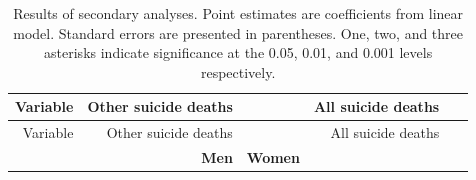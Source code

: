 \documentclass[]{article}
\begin{document}
\begin{longtable}[c]{@{}rrrrr@{}}
\caption{Results of secondary analyses. Point estimates are coefficients
from linear model. Standard errors are presented in parentheses. One,
two, and three asterisks indicate significance at the 0.05, 0.01, and
0.001 levels respectively.}\tabularnewline
\toprule
\begin{minipage}[b]{0.17\columnwidth}\raggedleft\strut
Variable
\strut\end{minipage} &
\begin{minipage}[b]{0.20\columnwidth}\raggedleft\strut
Other suicide deaths
\strut\end{minipage} &
\begin{minipage}[b]{0.16\columnwidth}\raggedleft\strut
~
\strut\end{minipage} &
\begin{minipage}[b]{0.18\columnwidth}\raggedleft\strut
All suicide deaths
\strut\end{minipage} &
\begin{minipage}[b]{0.15\columnwidth}\raggedleft\strut
~
\strut\end{minipage}\tabularnewline
\midrule
\endfirsthead
\toprule
\begin{minipage}[b]{0.17\columnwidth}\raggedleft\strut
Variable
\strut\end{minipage} &
\begin{minipage}[b]{0.20\columnwidth}\raggedleft\strut
Other suicide deaths
\strut\end{minipage} &
\begin{minipage}[b]{0.16\columnwidth}\raggedleft\strut
~
\strut\end{minipage} &
\begin{minipage}[b]{0.18\columnwidth}\raggedleft\strut
All suicide deaths
\strut\end{minipage} &
\begin{minipage}[b]{0.15\columnwidth}\raggedleft\strut
~
\strut\end{minipage}\tabularnewline
\midrule
\endhead
\begin{minipage}[t]{0.17\columnwidth}\raggedleft\strut
\strut\end{minipage} &
\begin{minipage}[t]{0.20\columnwidth}\raggedleft\strut
\textbf{Men}
\strut\end{minipage} &
\begin{minipage}[t]{0.16\columnwidth}\raggedleft\strut
\textbf{Women}
\strut\end{minipage} &

\end{longtable}
\end{document}
